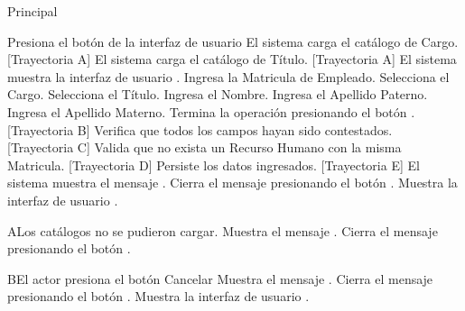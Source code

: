 \begin{UCtrayectoria}{Principal}

    \UCpaso[\UCactor] Presiona el botón  de la interfaz de usuario 
    \UCpaso El sistema carga el catálogo de Cargo. [Trayectoria A]
    \UCpaso El sistema carga el catálogo de Título. [Trayectoria A]
    \UCpaso El sistema muestra la interfaz de usuario .
    \UCpaso[\UCactor] Ingresa la Matricula de Empleado.
    \UCpaso[\UCactor] Selecciona el Cargo.
    \UCpaso[\UCactor] Selecciona el Título.
    \UCpaso[\UCactor] Ingresa el Nombre.
    \UCpaso[\UCactor] Ingresa el Apellido Paterno.
    \UCpaso[\UCactor] Ingresa el Apellido Materno.
    \UCpaso[\UCactor] Termina la operación presionando el botón . [Trayectoria B]
    \UCpaso Verifica que todos los campos hayan sido contestados. [Trayectoria C]
    \UCpaso Valida que no exista un Recurso Humano con la misma Matricula. [Trayectoria D]
    \UCpaso Persiste los datos ingresados. [Trayectoria E]
    \UCpaso El sistema muestra el mensaje .
    \UCpaso[\UCactor] Cierra el mensaje presionando el botón .
    \UCpaso Muestra la interfaz de usuario .
\end{UCtrayectoria}


\begin{UCtrayectoriaA}{A}{Los catálogos no se pudieron cargar.}
    \UCpaso Muestra el mensaje .
    \UCpaso[\UCactor] Cierra el mensaje presionando el botón .
\end{UCtrayectoriaA}


\begin{UCtrayectoriaA}{B}{El actor presiona el botón Cancelar}
    \UCpaso Muestra el mensaje .
    \UCpaso[\UCactor] Cierra el mensaje presionando el botón .
    \UCpaso Muestra la interfaz de usuario .
\end{UCtrayectoriaA}


